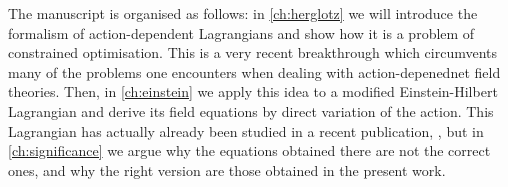 \documentclass[../main.tex]{subfiles}
\begin{document}
The manuscript is organised as follows: in \cref{ch:herglotz} we will introduce the formalism
of action-dependent Lagrangians and show how it is a problem of constrained optimisation.
This is a very recent breakthrough which circumvents many of the problems one encounters
when dealing with action-depenednet field theories. Then, in \cref{ch:einstein} we apply
this idea to a modified Einstein-Hilbert Lagrangian and derive its field equations by
direct variation of the action. This Lagrangian has actually already been studied in a
recent publication, \cite{Lazo2017}, but in \cref{ch:significance} we argue why the
equations obtained there are not the correct ones, and why the right version are those
obtained in the present work. 
\end{document}
